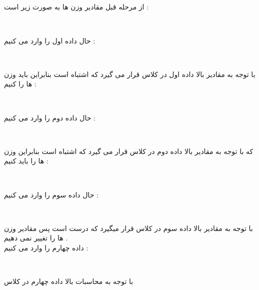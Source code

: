 \documentclass{article}
\begin{document}
\subsection*{}
از مرحله قبل مقادیر وزن ها به صورت زیر است  :‌
\begin{center}
	\\
\end{center}
حال داده اول را وارد می کنیم   : 
\begin{center}
	\\
\end{center}
با توجه به مقادیر بالا داده اول در کلاس 
قرار می گیرد که اشتباه است بنابراین باید وزن ها را 
کنیم  : 
\begin{center}
	\\
\end{center}
حال داده دوم را وارد می کنیم  : 
\begin{center}
	\\
\end{center}
که با توجه به مقادیر بالا داده دوم در کلاس 
قرار می گیرد که اشتباه است بنابراین وزن ها را باید 
کنیم  :‌
\begin{center}
	\\
\end{center}
حال داده سوم را وارد می کنیم :
\begin{center}
	\\
\end{center}
با توجه به مقادیر بالا داده سوم در کلاس 
قرار میگیرد که درست است پس مقادیر وزن ها را تغییر نمی دهیم  . \\
داده چهارم را وارد می کنیم  : 
\begin{center}
	\\
\end{center}
با توجه به محاسبات بالا داده چهارم در کلاس 
\end{document}
